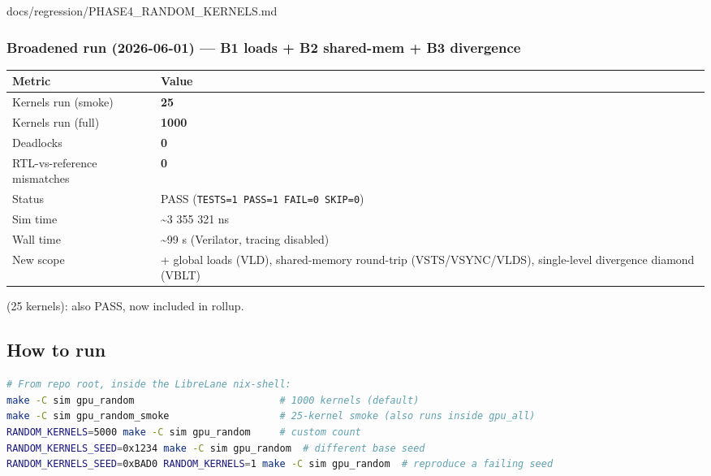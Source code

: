 \begin{relocated}{docs/regression/PHASE4_RANDOM_KERNELS.md}
\subsubsection{Broadened run (2026-06-01) --- B1 loads + B2 shared-mem +
B3 divergence}\label{tm:suite:phase4-random-kernels:broadened-run-2026-06-01-b1-loads-b2-shared-mem-b3-divergence}

{\small\setlength{\tabcolsep}{4pt}

{
\begin{longtable}[]{@{}
  >{\raggedright\arraybackslash}p{}
  >{\raggedright\arraybackslash}p{}@{}}
\toprule\noalign{}
\begin{minipage}[b]{\linewidth}\raggedright
Metric
\end{minipage} & \begin{minipage}[b]{\linewidth}\raggedright
Value
\end{minipage} \\
\midrule\noalign{}
\endhead
\bottomrule\noalign{}
\endlastfoot
Kernels run (smoke) & \textbf{25} \\
Kernels run (full) & \textbf{1000} \\
Deadlocks & \textbf{0} \\
RTL-vs-reference mismatches & \textbf{0} \\
Status & PASS
(\texttt{TESTS=\allowbreak{}1\ PASS=\allowbreak{}1\ FAIL=\allowbreak{}0\ SKIP=\allowbreak{}0}) \\
Sim time & \textasciitilde3 355 321 ns \\
Wall time & \textasciitilde99 s (Verilator, tracing disabled) \\
New scope & + global loads (VLD), shared-memory round-trip
(VSTS/\allowbreak{}VSYNC/\allowbreak{}VLDS), single-level divergence
diamond (VBLT) \\
\end{longtable}
}

}

 (25 kernels): also PASS, now included in
 rollup.

\subsection{How to run}\label{tm:suite:phase4-random-kernels:how-to-run}

\begin{lstlisting}[language=bash]
# From repo root, inside the LibreLane nix-shell:
make -C sim gpu_random                         # 1000 kernels (default)
make -C sim gpu_random_smoke                   # 25-kernel smoke (also runs inside gpu_all)
RANDOM_KERNELS=5000 make -C sim gpu_random     # custom count
RANDOM_KERNELS_SEED=0x1234 make -C sim gpu_random  # different base seed
RANDOM_KERNELS_SEED=0xBAD0 RANDOM_KERNELS=1 make -C sim gpu_random  # reproduce a failing seed


\end{lstlisting}
\end{relocated}
